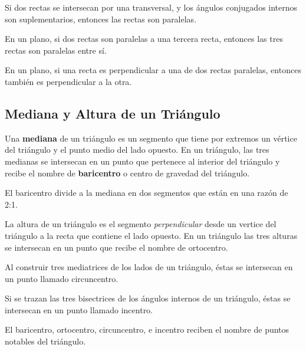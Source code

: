 \begin{theorem}
    Si dos rectas se intersecan por una transversal, y los ángulos conjugados internos son suplementarios, entonces las rectas son paralelas.
\end{theorem}

\begin{theorem}
    En un plano, si dos rectas son paralelas a una tercera recta, entonces las tres rectas son paralelas entre sí.
\end{theorem}

\begin{theorem}
    En un plano, si una recta es perpendicular a una de dos rectas paralelas, entonces también es perpendicular a la otra.
\end{theorem}

\subsection{Mediana y Altura de un Triángulo}

\begin{definition}
    Una \textbf{mediana} de un triángulo es un segmento que tiene por extremos un vértice del triángulo  y el punto medio del lado opuesto. En un triángulo, las tres medianas se intersecan en un punto que pertenece al interior del triángulo y recibe el nombre de \textbf{baricentro} o centro de gravedad del triángulo.
\end{definition}

\begin{theorem}
    El baricentro divide a la mediana en dos segmentos que están en una razón de 2:1.
\end{theorem}

\begin{definition}
    La altura de un triángulo es el segmento \textit{perpendicular} desde un vertice del triángulo a la recta que contiene el lado opuesto. En un triángulo las tres alturas se intersecan en un punto que recibe el nombre de ortocentro.
\end{definition}

\begin{definition}
    Al construir tres mediatrices de los lados de un triángulo, éstas se intersecan en un punto llamado circuncentro.
\end{definition}

\begin{definition}
    Si se trazan las tres bisectrices de los ángulos internos de un triángulo, éstas se intersecan en un punto llamado incentro.
\end{definition}

\begin{definition}
    El baricentro, ortocentro, circuncentro, e incentro reciben el nombre de puntos notables del triángulo.    
\end{definition}
